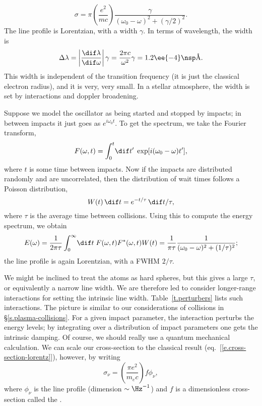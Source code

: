 \begin{equation}\label{e.cross-section-lorentz}
	\sigma = \pi\left(\frac{e^{2}}{mc}\right)\frac{\gamma}{(\omega_{0}-\omega)^{2} + (\gamma/2)^{2}}.
\end{equation}
The line profile is Lorentzian, with a width $\gamma$. In terms of wavelength, the width is
\[ 
	\Delta \lambda = \left|\frac{\dif\lambda}{\dif\omega}\right|\gamma = \frac{2\pi c}{\omega^{2}}\gamma
	= 1.2\ee{-4}\nsp\textrm{\AA}.
\]
This width is independent of the transition frequency (it is just the classical electron radius), and it is very, very small.  In a stellar atmosphere, the width is set by interactions and doppler broadening.

Suppose we model the oscillator as being started and stopped by impacts; in between impacts it just goes as $e^{i\omega_{0}t}$.  To get the spectrum, we take the Fourier transform,
\[
	F(\omega,t) = \int_{0}^{t}\!\dif t'\; \exp[i(\omega_{0}-\omega)t'],
\]
where $t$ is some time between impacts. Now if the impacts are distributed randomly and are uncorrelated, then the distribution of wait times follows a Poisson distribution,
\[ W(t)\,\dif t = e^{-t/\tau}\,\dif t/\tau, \]
where $\tau$ is the average time between collisions.  Using this to compute the energy spectrum, we obtain
\[ E(\omega) = \frac{1}{2\pi\tau}\int_{0}^{\infty}\!\dif t\; F(\omega,t)F^{*}(\omega,t)W(t) = \frac{1}{\pi\tau} 
	\frac{1}{(\omega_{0}-\omega)^{2} + (1/\tau)^{2}};
\]
the line profile is again Lorentzian, with a FWHM $2/\tau$.

We might be inclined to treat the atoms as hard spheres, but this gives a large $\tau$, or equivalently a narrow line width. We are therefore led to consider longer-range interactions for setting the intrinsic line width. Table~\ref{t.perturbers} lists such interactions\cite{Mihalas1978Stellar-Atmosph}. The picture is similar to our considerations of collisions in \S\ref{s.plasma-collisions}. For a given impact parameter, the interaction perturbs the energy levels; by integrating over a distribution of  impact parameters one gets the intrinsic damping. Of course, we should really use a quantum mechanical calculation.  We can scale our cross-section to the classical result (eq.~[\ref{e.cross-section-lorentz}]), however, by writing
\begin{equation}\label{e.cross-section}
	 \sigma_{\nu} = \left(\frac{\pi e^{2}}{m_{e}c}\right) f \phi_{\nu}, 
\end{equation}
where $\phi_{\nu}$ is the line profile (dimension $\sim \Hz^{-1}$) and $f$ is a dimensionless cross-section called the .

